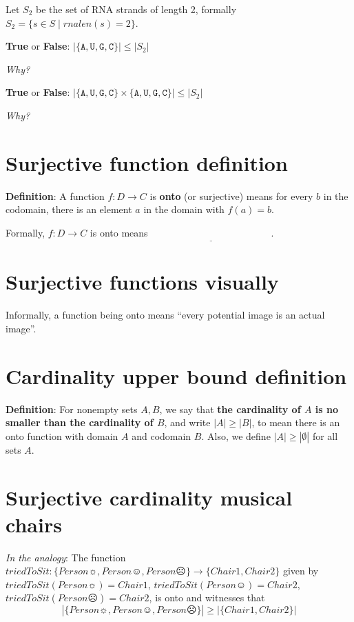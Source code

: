 \documentclass[12pt, oneside]{article}
\newcommand{\A}[0]{\texttt{A}}
\newcommand{\C}[0]{\texttt{C}}
\newcommand{\G}[0]{\texttt{G}}
\newcommand{\U}[0]{\texttt{U}}
\begin{document}
Let $S_2$ be the set of RNA strands of length 2, formally $S_2 = \{ s \in S \mid rnalen(s) = 2\}$.

{\bf True} or {\bf False}: $| \{\A,\U,\G,\C\} | \leq |S_2 |$ 

{\it Why?}
\vspace{80pt}

{\bf True} or {\bf False}: $| \{\A,\U,\G,\C\} \times \{\A, \U, \G,\C\} | \leq |S_2 |$

{\it Why?}
\vspace{80pt}
 \vfill
\section*{Surjective function definition}


{\bf Definition}: A function $f: D  \to C$ is {\bf onto} (or  surjective) means for every $b$ in the codomain, 
there  is an element $a$ in the domain with  $f(a) = b$.

Formally, $f: D  \to  C$ is  onto  means $\underline{\phantom{\forall b \in C  \exists a \in D ( f(a) = b)}}$.
 \vfill
\section*{Surjective functions visually}


Informally, a function being onto means ``every potential image is an actual image''.

\phantom{Draw finite domain, finite codomain picture with duplicate image.}
\vspace{50pt} \vfill
\section*{Cardinality upper bound definition}


{\bf Definition}:  For nonempty sets $A, B$, we say that {\bf the  cardinality of $A$ is  no  smaller than 
the cardinality of  $B$}, and 
write $|A| \geq |B|$, to mean there is an onto function  with domain $A$  and codomain $B$.
Also, we define $|A| \geq |\emptyset|$ for all sets $A$.
 \vfill
\section*{Surjective cardinality musical chairs}


{\it In the analogy}: The function $triedToSit: \{ Person\sun, Person\smiley, Person\frownie \} \to  \{ Chair1, Chair2\} $ given
by $triedToSit(Person\sun) = Chair1$,  $triedToSit(Person\smiley) = Chair2$, 
$triedToSit(Person\frownie) = Chair2$, is onto and witnesses that 
\[
 |\{ Person\sun, Person\smiley, Person\frownie \}| \geq | \{ Chair1, Chair2\} |
\] \vfill
\end{document}
